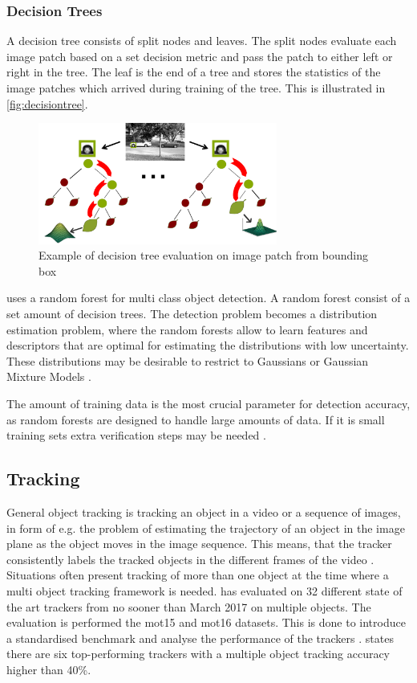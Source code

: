 \subsubsection{Decision Trees}
A decision tree consists of split nodes and leaves. The split nodes evaluate each image patch based on a set decision metric and pass the patch to either left or right in the tree. The leaf is the end of a tree and stores the statistics of the image patches which arrived during training of the tree. This is illustrated in \autoref{fig:decisiontree}.

\begin{figure}[H]
  \centering
  \includegraphics[width=0.7\textwidth]{figures/decisiontree}
  \caption{Example of decision tree evaluation on image patch from bounding box \citep{Gall2012}}
  \label{fig:decisiontree}
\end{figure}

\cite{Gall2012} uses a random forest for multi class object detection. A random forest consist of a set amount of decision trees.
The detection problem becomes a distribution estimation problem, where the random forests allow to learn features and descriptors that are optimal for estimating the distributions with low uncertainty. These distributions may be desirable to restrict to Gaussians or Gaussian Mixture Models \citep{Gall2012}.

The amount of training data is the most crucial parameter for detection accuracy, as random forests are designed to handle large amounts of data. If it is small training sets extra verification steps may be needed \citep{Gall2012}.

\subsection{Tracking}
General object tracking is tracking an object in a video or a sequence of images, in form of e.g. the problem of estimating the trajectory of an object in the image plane as the object moves in the image sequence. This means, that the tracker consistently labels the tracked objects in the different frames of the video \citep{Yilmaz2006}. Situations often present tracking of more than one object at the time where a multi object tracking framework is needed. \cite{Leal-Taixe2017} has evaluated on 32 different state of the art trackers from no sooner than March 2017 on multiple objects. The evaluation is performed the \gls{mot}15 and \gls{mot}16 datasets. This is done to introduce a standardised benchmark and analyse the performance of the trackers \citep{Leal-Taixe2017}. \cite{Leal-Taixe2017} states there are six top-performing trackers with a multiple object tracking accuracy higher than 40\%. 
